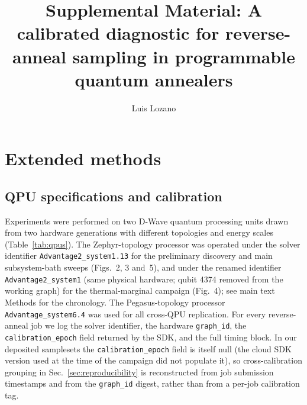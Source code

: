 \documentclass[aps,prapplied,reprint,superscriptaddress,floatfix,nofootinbib]{revtex4-2}
\begin{document}
\title{Supplemental Material: A calibrated diagnostic for reverse-anneal sampling in programmable quantum annealers}

\author{Luis Lozano}

\maketitle

\tableofcontents

\section{Extended methods}

\subsection{QPU specifications and calibration}
\label{sec:qpu}

Experiments were performed on two D-Wave quantum processing units drawn from two hardware generations with different topologies and energy scales (Table~\ref{tab:qpus}).
The Zephyr-topology processor was operated under the solver identifier \texttt{Advantage2\_system1.13} for the preliminary discovery and main subsystem-bath sweeps (Figs.~2, 3 and~5), and under the renamed identifier \texttt{Advantage2\_system1} (same physical hardware; qubit 4374 removed from the working graph) for the thermal-marginal campaign (Fig.~4); see main text Methods for the chronology.
The Pegasus-topology processor \texttt{Advantage\_system6.4} was used for all cross-QPU replication.
For every reverse-anneal job we log the solver identifier, the hardware \texttt{graph\_id}, the \texttt{calibration\_epoch} field returned by the SDK, and the full timing block.  In our deposited samplesets the \texttt{calibration\_epoch} field is itself null (the cloud SDK version used at the time of the campaign did not populate it), so cross-calibration grouping in Sec.~\ref{sec:reproducibility} is reconstructed from job submission timestamps and from the \texttt{graph\_id} digest, rather than from a per-job calibration tag.
\end{document}
